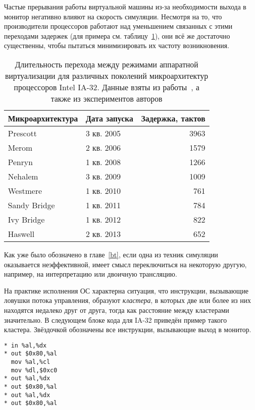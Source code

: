 Частые прерывания работы виртуальной машины из-за необходимости выхода в монитор негативно влияют на скорость симуляции.  Несмотря на то, что производители процессоров работают над уменьшением связанных с этими переходами задержек (для примера см. таблицу~\ref{tab:vmexit-latency}), они всё же достаточно существенны, чтобы пытаться минимизировать их частоту возникновения.

\begin{table}[htb]
\centering
\begin{tabular}{|l|l|r|}\hline
\textbf{Микроархитектура} & \textbf{Дата запуска} & \textbf{Задержка, тактов} \\\hline
Prescott     & 3 кв. 2005 & 3963 \\\hline
Merom        & 2 кв. 2006 & 1579 \\\hline
Penryn       & 1 кв. 2008 & 1266 \\\hline
Nehalem      & 3 кв. 2009 & 1009 \\\hline
Westmere     & 1 кв. 2010 & 761 \\\hline
Sandy Bridge & 1 кв. 2011 & 784 \\\hline
Ivy Bridge   & 1 кв. 2012 & 822 \\\hline
Haswell      & 2 кв. 2013 & 652 \\\hline

\end{tabular}
\caption[Длительность перехода между режимами аппаратной виртуализации]{Длительность перехода между режимами аппаратной виртуализации для различных поколений микроархитектур процессоров Intel IA-32. Данные взяты из работы \cite{Agesen:2012:STA:2342821.2342856}, а также из экспериментов авторов}
\label{tab:vmexit-latency}
\end{table}

Как уже было обозначено в главе~\ref{bt}, если одна из техник симуляции оказывается неэффективной, имеет смысл переключиться на некоторую другую, например, на интерпретацию или двоичную трансляцию.

На практике исполнения ОС характерна ситуация, что инструкции, вызывающие ловушки потока управления, образуют \emph{кластера}, в которых две или более из них находятся недалеко друг от друга, тогда как расстояние между кластерами значительно. В следующем блоке кода для IA-32 приведён пример такого кластера. Звёздочкой обозначены все инструкции, вызывающие выход в монитор.

\begin{lstlisting}
* in %al,%dx
* out $0x80,%al
  mov %al,%cl
  mov %dl,$0xc0
* out %al,%dx
* out $0x80,%al
* out %al,%dx
* out $0x80,%al
\end{lstlisting}


